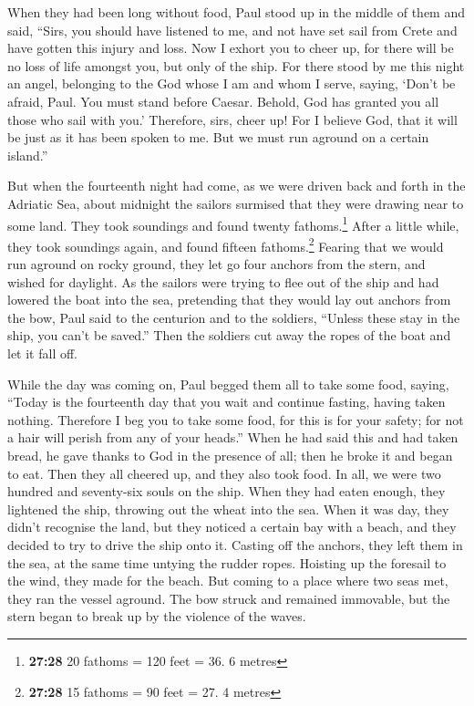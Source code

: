  When they had been long without food, Paul stood up in
the middle of them and said, ``Sirs, you should have listened to me, and
not have set sail from Crete and have gotten this injury and loss.
 Now I exhort you to cheer up, for there will be no loss
of life amongst you, but only of the ship.  For there
stood by me this night an angel, belonging to the God whose I am and
whom I serve,  saying, `Don't be afraid, Paul. You must
stand before Caesar. Behold, God has granted you all those who sail with
you.'  Therefore, sirs, cheer up! For I believe God, that
it will be just as it has been spoken to me.  But we must
run aground on a certain island.''

 But when the fourteenth night had come, as we were
driven back and forth in the Adriatic Sea, about midnight the sailors
surmised that they were drawing near to some land.  They
took soundings and found twenty fathoms.\footnote{\textbf{27:28} 20
  fathoms = 120 feet = 36. 6 metres} After a little while, they took
soundings again, and found fifteen fathoms.\footnote{\textbf{27:28} 15
  fathoms = 90 feet = 27. 4 metres}  Fearing that we
would run aground on rocky ground, they let go four anchors from the
stern, and wished for daylight.  As the sailors were
trying to flee out of the ship and had lowered the boat into the sea,
pretending that they would lay out anchors from the bow, 
Paul said to the centurion and to the soldiers, ``Unless these stay in
the ship, you can't be saved.''  Then the soldiers cut
away the ropes of the boat and let it fall off.

 While the day was coming on, Paul begged them all to
take some food, saying, ``Today is the fourteenth day that you wait and
continue fasting, having taken nothing.  Therefore I beg
you to take some food, for this is for your safety; for not a hair will
perish from any of your heads.''  When he had said this
and had taken bread, he gave thanks to God in the presence of all; then
he broke it and began to eat.  Then they all cheered up,
and they also took food.  In all, we were two hundred and
seventy-six souls on the ship.  When they had eaten
enough, they lightened the ship, throwing out the wheat into the sea.
 When it was day, they didn't recognise the land, but
they noticed a certain bay with a beach, and they decided to try to
drive the ship onto it.  Casting off the anchors, they
left them in the sea, at the same time untying the rudder ropes.
Hoisting up the foresail to the wind, they made for the beach.
 But coming to a place where two seas met, they ran the
vessel aground. The bow struck and remained immovable, but the stern
began to break up by the violence of the waves.

